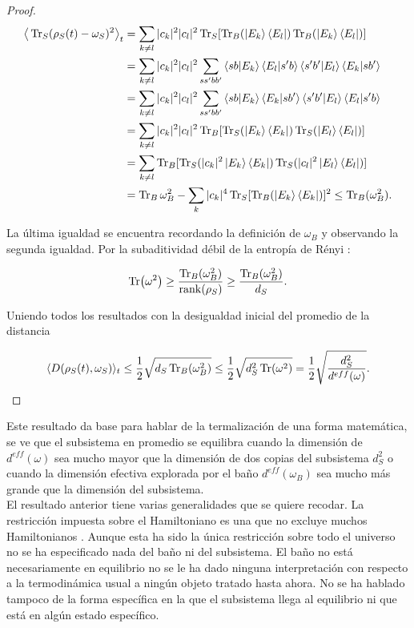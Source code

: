 \begin{proof}
\begin{align*}
\big \langle \Tr_{S}(\rho_{S}(t)-\omega_{S})^{2} \big \rangle_{t} &= \sum_{k \neq l} |c_{k}|^{2} |c_{l}|^{2} \Tr_{S} [\Tr_{B}(\ket{E_{k}} \bra{E_{l}}) \Tr_{B}(\ket{E_{k}} \bra{E_{l}})]\\
	&=\sum_{k \neq l} |c_{k}|^{2} |c_{l}|^{2} \sum_{ss' bb'} \bra{sb}\ket{E_{k}} \bra{E_{l}}\ket{s'b} \bra{s'b'}\ket{E_{l}} \bra{E_{k}}\ket{sb'}\\
	&=\sum_{k \neq l} |c_{k}|^{2} |c_{l}|^{2} \sum_{ss' bb'} \bra{sb}\ket{E_{k}} \bra{E_{k}}\ket{sb'} \bra{s'b'}\ket{E_{l}} \bra{E_{l}}\ket{s'b}\\
	&=\sum_{k \neq l} |c_{k}|^{2} |c_{l}|^{2} \Tr_{B} [\Tr_{S}(\ket{E_{k}} \bra{E_{k}}) \Tr_{S}(\ket{E_{l}} \bra{E_{l}})]\\
	&=\sum_{k \neq l}  \Tr_{B} [\Tr_{S}(|c_{k}|^{2}\ket{E_{k}} \bra{E_{k}}) \Tr_{S}( |c_{l}|^{2} \ket{E_{l}} \bra{E_{l}})]\\
&=\Tr_{B} \omega_{B}^{2} -\sum_{k} |c_{k}|^{4} \Tr_{S}[ \Tr_{B}( \ket{E_{k}} \bra{E_{k}})]^{2} \leq  \Tr_{B}( \omega_{B}^{2}).
\end{align*}

La última igualdad se encuentra recordando la definición de $\omega_{B}$ y observando la segunda igualdad. Por la subaditividad débil de la entropía de Rényi \cite{RenyiEntropia}:

\begin{equation}
\Tr(\omega^{2}) \geq  \frac{\Tr_{B}(\omega_{B}^{2})}{ \rank (\rho_{S})} \geq \frac{\Tr_{B}(\omega_{B}^{2})}{d_{S}}.
\end{equation}

Uniendo todos los resultados con la desigualdad inicial del promedio de la distancia

\begin{equation}
\langle D(\rho_{S}(t) ,\omega_{S}) \rangle_{t} \le  \frac{1}{2} \sqrt{d_{S} \Tr_{B}(\omega_{B}^{2})} \le \frac{1}{2}\sqrt{d_{S}^{2} 	\Tr(\omega^{2})}=\frac{1}{2}\sqrt{\frac{d_{S}^{2}}{d^{eff}(\omega)}}.
\end{equation}
\end{proof}
Este resultado da base para hablar de la termalización de una forma matemática, se ve que el subsistema en promedio se equilibra cuando la dimensión de $d^{eff}(\omega)$ sea mucho mayor que la dimensión de dos copias del subsistema $d_{S}^{2}$ o cuando la dimensión efectiva explorada por el baño $d^{eff}(\omega_{B})$ sea mucho más grande que la dimensión del subsistema.
\\
El resultado anterior tiene varias generalidades que se quiere recodar. La restricción impuesta sobre el Hamiltoniano  es una que no excluye muchos Hamiltonianos \cite{SakuraiQuantum}. Aunque esta ha sido la única restricción sobre todo el universo no se ha especificado nada del baño ni del subsistema. El baño no está necesariamente en equilibrio no se le ha dado ninguna interpretación con respecto a la termodinámica usual a ningún objeto tratado hasta ahora. No se ha hablado tampoco de la forma específica en la que el subsistema llega al equilibrio ni que está en algún estado específico.
